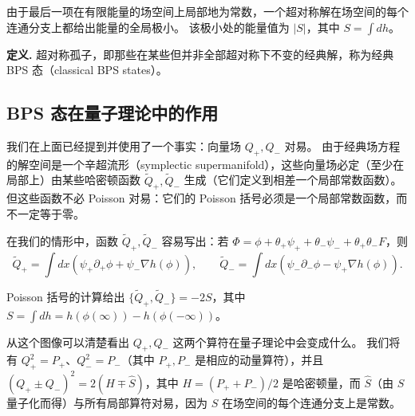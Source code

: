 由于最后一项在有限能量的场空间上局部地为常数，一个超对称解在场空间的每个连通分支上都给出能量的全局极小。
该极小处的能量值为 $|S|$，其中 $S=\int dh$。

\textbf{定义.} 超对称孤子，即那些在某些但并非全部超对称下不变的经典解，称为经典 BPS 态（classical BPS states）。

\subsection{BPS 态在量子理论中的作用}

我们在上面已经提到并使用了一个事实：向量场 $Q_+,Q_-$ 对易。
由于经典场方程的解空间是一个辛超流形（symplectic supermanifold），这些向量场必定（至少在局部上）由某些哈密顿函数 $\tilde Q_+,\tilde Q_-$ 生成（它们定义到相差一个局部常数函数）。
但这些函数不必 Poisson 对易：它们的 Poisson 括号必须是一个局部常数函数，而不一定等于零。

在我们的情形中，函数 $\tilde Q_+,\tilde Q_-$ 容易写出：若 $\Phi=\phi+\theta_+\psi_++\theta_-\psi_-+\theta_+\theta_-F$，则
\begin{equation}
  \tag{12.9}
  \label{eq:12-9}
  \tilde Q_+=\int dx\left(\psi_+\partial_+\phi+\psi_-\nabla h(\phi)\right),\qquad
  \tilde Q_-=\int dx\left(\psi_-\partial_-\phi-\psi_+\nabla h(\phi)\right).
\end{equation}

Poisson 括号的计算给出 $\{\tilde Q_+,\tilde Q_-\}=-2S$，其中 $S=\int dh=h(\phi(\infty))-h(\phi(-\infty))$。


从这个图像可以清楚看出 $Q_+,Q_-$ 这两个算符在量子理论中会变成什么。
我们将有 $Q_+^2=P_+$、$Q_-^2=P_-$（其中 $P_+,P_-$ 是相应的动量算符），并且 $(Q_+\pm Q_-)^2=2(H\mp\hat S)$，其中 $H=(P_++P_-)/2$ 是哈密顿量，而 $\hat S$（由 $S$ 量子化而得）与所有局部算符对易，因为 $S$ 在场空间的每个连通分支上是常数。

